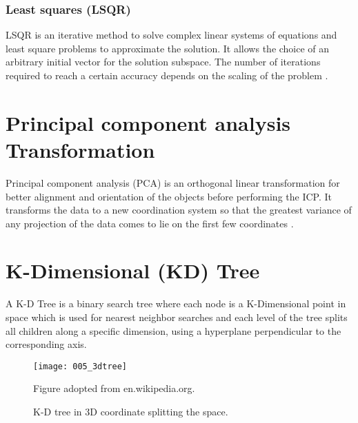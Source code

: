 \documentclass[../structure.tex]{subfiles}
\begin{document}
\subsubsection{Least squares (LSQR)}
		
LSQR is an iterative method to solve complex linear systems of equations and least square problems to approximate the solution. It allows the choice of an arbitrary initial vector for the solution subspace. The number of iterations required to reach a certain accuracy depends on the scaling of the problem \cite{Paige1982a}.

\section{Principal component analysis Transformation}

Principal component analysis (PCA) is an orthogonal linear transformation for better alignment and orientation of the objects before performing the ICP.  It transforms the data to a new coordination system so that the greatest variance of any projection of the data comes to lie on the first few coordinates \cite{Jolliffe2002}.

\section{K-Dimensional (KD) Tree}

A K-D Tree is a binary search tree where each node is a K-Dimensional point in space which is used for nearest neighbor searches and each level of the tree splits all children along a specific dimension, using a hyperplane perpendicular to the corresponding axis.

\begin{figure}[h!]
	\centering
	\texttt{[image: 005\_3dtree]}
	\captionsetup{justification=centering}
	\caption{K-D tree in 3D coordinate splitting the space.}%
	 {Figure adopted from en.wikipedia.org.}
	\label{fig:k_d_tree}
\end{figure}
\end{document}
